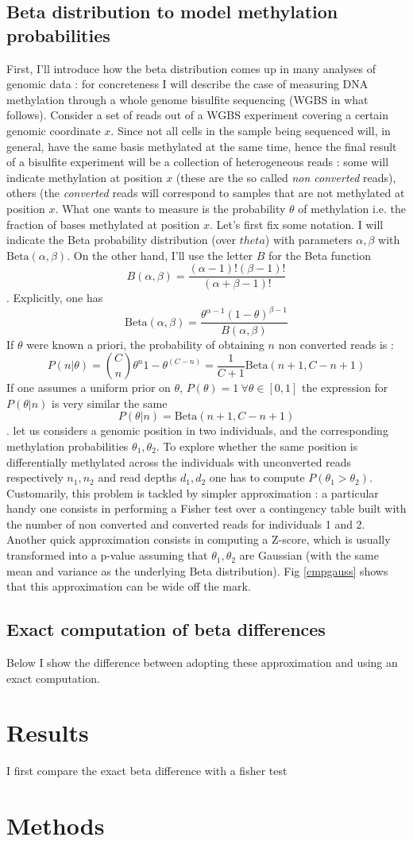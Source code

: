 \documentclass{amsart}
\begin{document}
\subsection{Beta distribution to model methylation probabilities}
First, I'll introduce how the beta distribution comes up in many analyses of genomic data : for concreteness I will describe the case of measuring DNA methylation through a whole genome bisulfite sequencing (WGBS in what follows). 
Consider a set of reads out of a WGBS experiment covering a certain genomic coordinate $x$. Since not all cells in the sample being sequenced will, in general,  have the same basis methylated at the same time, hence the final result of a bisulfite experiment will be a collection of heterogeneous reads : some will indicate methylation at position $x$ (these are the so called {\em non converted} reads), others (the {\em converted} reads will correspond to samples that are not methylated at position $x$. What one wants to measure is the probability $\theta$ of methylation i.e. the fraction of bases methylated at position $x$. Let's first fix some notation. I will indicate the Beta probability distribution (over $theta$) with parameters $\alpha,\beta$ with $\mbox{Beta}(\alpha,\beta)$. On the other hand, I'll use the letter $B$ for the Beta function 
\[B(\alpha,\beta)=\frac{(\alpha-1)!(\beta-1)!}{(\alpha+\beta-1)!}\]. Explicitly, one has \[\mbox{Beta}(\alpha,\beta)=\frac{\theta^{\alpha-1}(1-\theta)^{\beta-1}}{B(\alpha,\beta)}\] If $\theta$ were known a priori, the probability of obtaining $n$ non converted reads is :
\[P(n|\theta)={C \choose n}\theta^n {1-\theta}^(C-n)=\frac{1}{C+1}\mbox{Beta}(n+1,C-n+1)\]
If one assumes a uniform prior on $\theta$, $P(\theta)=1 \ \forall \theta \in [0,1]$ the expression for $P(\theta|n)$ is very similar the same 
\[P(\theta|n)=\mbox{Beta}(n+1,C-n+1)\].
let us considers a genomic position in two individuals, and the corresponding methylation probabilities $\theta_1,\theta_2$. 
To explore whether the same position is differentially methylated across the individuals with unconverted reads respectively $n_1,n_2$ and read depths $d_1,d_2$ one
has to compute $P(\theta_1>\theta_2)$. 
Customarily, this problem is tackled by simpler approximation : a particular handy one consists in performing a Fisher test over a contingency table built with the number of non converted and converted reads for individuals 1 and 2. Another quick approximation consists in computing a Z-score, which is usually transformed into a p-value assuming that $\theta_1,\theta_2$ are Gaussian (with the same mean and variance as the underlying Beta distribution).  Fig \ref{cmpgauss} shows that this approximation can be wide off the mark.
\subsection{Exact computation of beta differences}


Below I show the difference between adopting these approximation and using an exact computation.
\section{Results} 
I first compare the exact beta difference with a fisher test
\section{Methods}
\end{document}
